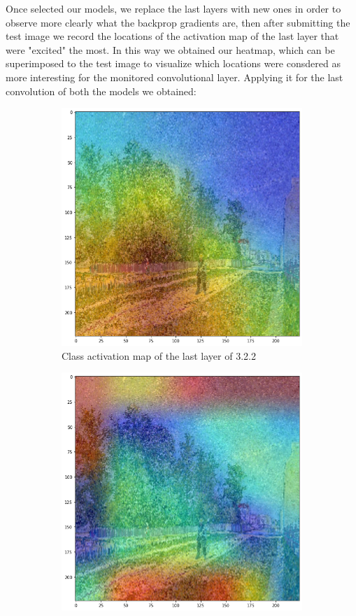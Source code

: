 \noindent Once selected our models, we replace the last layers with new ones in order to observe more clearly what the backprop gradients are, then after submitting the test image we record the locations of the activation map of the last layer that were "excited" the most. In this way we obtained our heatmap, which can be superimposed to the test image to visualize which locations were consdered as more interesting for the monitored convolutional layer. Applying it for the last convolution of both the models we obtained:


\begin{figure}[H]
	\begin{subfigure}{0.5\textwidth}
		\includegraphics[width=0.9\linewidth]{img/scratch/visualization/ad_heatmap.png} 
		\caption{Class activation map of the last layer of 3.2.2}
		\label{fig:ad_heatmap}
	\end{subfigure}
	\begin{subfigure}{0.5\textwidth}
		\includegraphics[width=0.9\linewidth]{img/scratch/visualization/il_heatmap.png}

\end{subfigure}
\end{figure}
